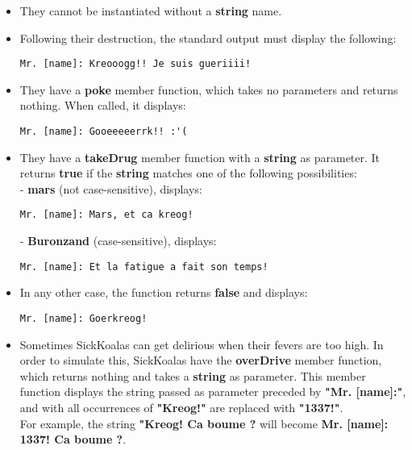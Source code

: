 \begin{itemize}

  \item They cannot be instantiated without a \textbf{string} name.

  \item Following their destruction, the standard output must display the following:
    \begin{lstlisting}
Mr. [name]: Kreooogg!! Je suis gueriiii!
    \end{lstlisting}

  \item They have a \textbf{poke} member function, which takes no parameters and
    returns nothing. When called, it displays:
    \begin{lstlisting}
Mr. [name]: Gooeeeeerrk!! :'(
    \end{lstlisting}

  \item They have a \textbf{takeDrug} member function with a \textbf{string} as
    parameter. It returns \textbf{true} if the \textbf{string} matches one of the
    following possibilities:\\

    - \textbf{mars} (not case-sensitive), displays:
    \begin{lstlisting}
Mr. [name]: Mars, et ca kreog!
    \end{lstlisting}

    - \textbf{Buronzand} (case-sensitive), displays:
    \begin{lstlisting}
Mr. [name]: Et la fatigue a fait son temps!
    \end{lstlisting}

  \item In any other case, the function returns \textbf{false} and displays:
    \begin{lstlisting}
Mr. [name]: Goerkreog!
    \end{lstlisting}

  \item Sometimes SickKoalas can get delirious when their fevers are too high.
    In order to simulate this, SickKoalas have the \textbf{overDrive} member function,
    which returns nothing and takes a \textbf{string} as parameter. This member
    function displays the string passed as parameter preceded by \textbf{"Mr. [name]:"},
    and with all occurrences of \textbf{"Kreog!"} are replaced with \textbf{"1337!"}.\\

    For example, the string \textbf{"Kreog! Ca boume ?} will become
    \textbf{Mr. [name]: 1337! Ca boume ?}.
\end{itemize}

